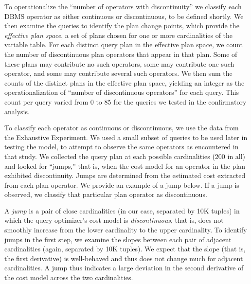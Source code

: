 \documentclass[prodmode,acmtods]{acmsmall}
\begin{document}
To operationalize the ``number of operators with discontinuity'' we
classify each \hbox{DBMS} operator as either continuous or discontinuous, to be
defined shortly.  We then examine the queries
to identify the plan change points, which provide the {\em effective plan
  space}, a set of plans chosen for one or
more cardinalities of the variable table. For each distinct query plan in the
effective plan space, we
count the number of discontinuous plan operators that appear in that plan. Some of
these plans may contribute no such operators, some may contribute one such
operator, and some may contribute several such operators. We then sum the
counts of the distinct plans in the effective plan space, yielding an
integer as the operationalization of ``number of discontinuous operators''
for each query.  This count per query varied from 0 to 85 for the
queries we tested in the confirmatory analysis.

To classify each operator as continuous or discontinuous, we use the data
from the Exhaustive Experiment. We
used a small subset of queries to be used later in testing the model, to
attempt to observe the same operators as encountered in that
study. We
collected the query plan at each possible cardinalities (200 in all) and
looked for ``jumps,'' that is, when the cost model for an operator in the
plan exhibited discontinuity. Jumps are determined from the estimated cost
extracted from each plan operator. We provide an example of a jump below. If
a jump is observed, we classify that particular plan operator as
discontinuous.

A {\em jump} is a pair of close cardinalities (in our case, separated by 10K
tuples) in which the query optimizer's cost model is {\em discontinuous},
that is, does not smoothly increase from the lower cardinality to the upper
cardinality. To identify jumps in the first step, we examine the slopes
between each pair of adjacent cardinalities (again, separated by 10K
tuples). We expect that the slope (that is, the first derivative) is
well-behaved and thus does not change much for adjacent cardinalities. 
A jump thus indicates a large deviation in the second derivative of the 
cost model across the two cardinalities.
\end{document}

